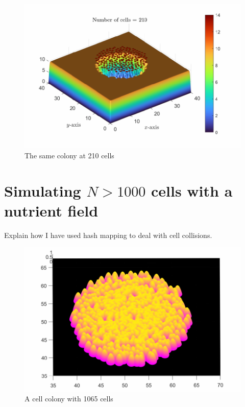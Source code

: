 \begin{figure}[h]
\centering
\includegraphics[width=1\textwidth]{chapter1/figures/ColonySimulationDemoNutrientField_N_210.pdf}
\caption{The same colony at 210 cells}
\label{fig:ColonySimulationNutrientFieldN210}
\end{figure}
\filbreak

\section{Simulating $N > 1000$ cells with a nutrient field}

Explain how I have used hash mapping to deal with cell collisions.

\begin{figure}[!htb] %
\centering
\includegraphics[width=1\textwidth]{chapter1/figures/ColonySimulationDemoNutrientField_N_1065.pdf}
\caption{A cell colony with 1065 cells }
\label{fig:ColonySimulationNutrientFieldN210}
\end{figure}
\filbreak



